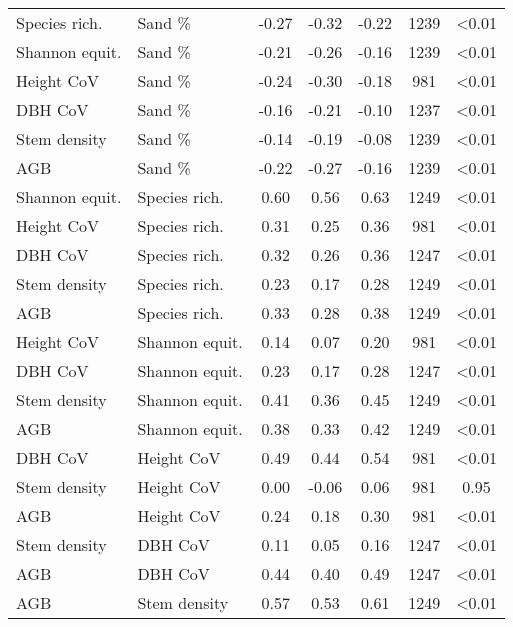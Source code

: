 \begin{longtable}{llS[table-format=-1.2]S[table-format=-1.2]S[table-format=-1.2]S[table-format=4.0]S[table-format=<1.2]}
Species rich. & Sand \% & -0.27 & -0.32 & -0.22 & 1239 & <0.01 \\ 
Shannon equit. & Sand \% & -0.21 & -0.26 & -0.16 & 1239 & <0.01 \\ 
Height CoV & Sand \% & -0.24 & -0.30 & -0.18 & 981 & <0.01 \\ 
DBH CoV & Sand \% & -0.16 & -0.21 & -0.10 & 1237 & <0.01 \\ 
Stem density & Sand \% & -0.14 & -0.19 & -0.08 & 1239 & <0.01 \\ 
AGB & Sand \% & -0.22 & -0.27 & -0.16 & 1239 & <0.01 \\ 
Shannon equit. & Species rich. & 0.60 & 0.56 & 0.63 & 1249 & <0.01 \\ 
Height CoV & Species rich. & 0.31 & 0.25 & 0.36 & 981 & <0.01 \\ 
DBH CoV & Species rich. & 0.32 & 0.26 & 0.36 & 1247 & <0.01 \\ 
Stem density & Species rich. & 0.23 & 0.17 & 0.28 & 1249 & <0.01 \\ 
AGB & Species rich. & 0.33 & 0.28 & 0.38 & 1249 & <0.01 \\ 
Height CoV & Shannon equit. & 0.14 & 0.07 & 0.20 & 981 & <0.01 \\ 
DBH CoV & Shannon equit. & 0.23 & 0.17 & 0.28 & 1247 & <0.01 \\ 
Stem density & Shannon equit. & 0.41 & 0.36 & 0.45 & 1249 & <0.01 \\ 
AGB & Shannon equit. & 0.38 & 0.33 & 0.42 & 1249 & <0.01 \\ 
DBH CoV & Height CoV & 0.49 & 0.44 & 0.54 & 981 & <0.01 \\ 
Stem density & Height CoV & 0.00 & -0.06 & 0.06 & 981 & 0.95 \\ 
AGB & Height CoV & 0.24 & 0.18 & 0.30 & 981 & <0.01 \\ 
Stem density & DBH CoV & 0.11 & 0.05 & 0.16 & 1247 & <0.01 \\ 
AGB & DBH CoV & 0.44 & 0.40 & 0.49 & 1247 & <0.01 \\ 
AGB & Stem density & 0.57 & 0.53 & 0.61 & 1249 & <0.01 \\ 
\bottomrule
\end{longtable}
